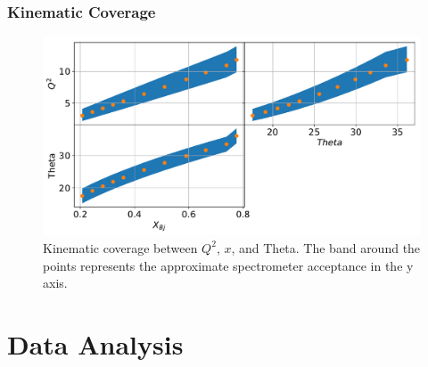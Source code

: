 \documentclass[12pt]{beamer}
\begin{document}
\begin{frame}
\frametitle{Kinematic Coverage}

\begin{figure}[h]
	\vspace*{-1.5cm}
	\centering
	\includegraphics[width=12.cm]{../images/Thesis/KinCov.pdf}
	\caption*{Kinematic coverage between $Q^2$, $x$, and Theta. The band around the points represents the approximate spectrometer acceptance in the y axis.}
	\label{fig:kincov}
\end{figure}
\end{frame}
\section[Analysis]{Data Analysis}
\end{document}
